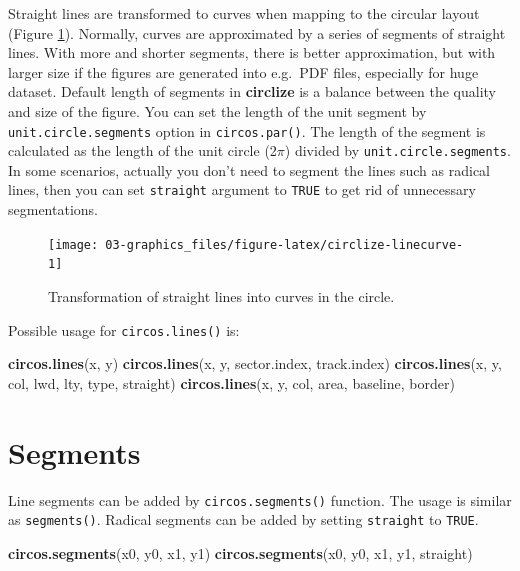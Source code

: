 \documentclass[]{book}
\newenvironment{Shaded}{\begin{snugshade}}{\end{snugshade}}
\newcommand{\KeywordTok}[1]{\textcolor[rgb]{0.13,0.29,0.53}{\textbf{#1}}}
\newcommand{\NormalTok}[1]{#1}
\theoremstyle{definition}
\theoremstyle{definition}
\theoremstyle{remark}
\begin{document}
Straight lines are transformed to curves when mapping to the circular
layout (Figure \ref{fig:circlize-linecurve}). Normally, curves are
approximated by a series of segments of straight lines. With more and
shorter segments, there is better approximation, but with larger size if
the figures are generated into e.g.~PDF files, especially for huge
dataset. Default length of segments in \textbf{circlize} is a balance
between the quality and size of the figure. You can set the length of
the unit segment by \texttt{unit.circle.segments} option in
\texttt{circos.par()}. The length of the segment is calculated as the
length of the unit circle (2\(\pi\)) divided by
\texttt{unit.circle.segments}. In some scenarios, actually you don't
need to segment the lines such as radical lines, then you can set
\texttt{straight} argument to \texttt{TRUE} to get rid of unnecessary
segmentations.

\begin{figure}

{\centering \texttt{[image: 03-graphics\_files/figure-latex/circlize-linecurve-1]} 

}

\caption{Transformation of straight lines into curves in the circle.}\label{fig:circlize-linecurve}
\end{figure}

Possible usage for \texttt{circos.lines()} is:

\begin{Shaded}
\begin{Highlighting}[]
\KeywordTok{circos.lines}\NormalTok{(x, y)}
\KeywordTok{circos.lines}\NormalTok{(x, y, sector.index, track.index)}
\KeywordTok{circos.lines}\NormalTok{(x, y, col, lwd, lty, type, straight)}
\KeywordTok{circos.lines}\NormalTok{(x, y, col, area, baseline, border)}
\end{Highlighting}
\end{Shaded}

\section{Segments}\label{segments}

Line segments can be added by \texttt{circos.segments()} function. The
usage is similar as \texttt{segments()}. Radical segments can be added
by setting \texttt{straight} to \texttt{TRUE}.

\begin{Shaded}
\begin{Highlighting}[]
\KeywordTok{circos.segments}\NormalTok{(x0, y0, x1, y1)}
\KeywordTok{circos.segments}\NormalTok{(x0, y0, x1, y1, straight)}
\end{Highlighting}
\end{Shaded}
\end{document}
